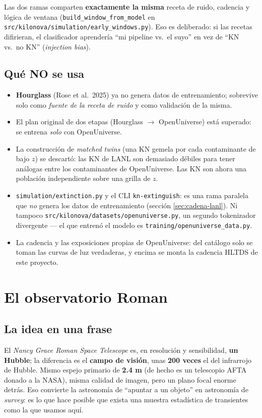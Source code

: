 \documentclass[11pt,a4paper]{article}
\newcommand{\code}[1]{\texttt{\small #1}}
\begin{document}
Las dos ramas comparten \textbf{exactamente la misma} receta de ruido, cadencia y lógica de
ventana (\code{build\_window\_from\_model} en \code{src/kilonova/simulation/early\_windows.py}).
Eso es deliberado: si las recetas difirieran, el clasificador aprendería ``mi pipeline vs.\ el
suyo'' en vez de ``KN vs.\ no KN'' (\emph{injection bias}).

\subsection{Qué NO se usa}
\begin{itemize}[nosep]
  \item \textbf{Hourglass} (Rose et al.\ 2025) ya no genera datos de entrenamiento; sobrevive solo
        como \emph{fuente de la receta de ruido} y como validación de la misma.
  \item El plan original de dos etapas (Hourglass $\to$ OpenUniverse) está superado: se entrena
        \emph{solo} con OpenUniverse.
  \item La construcción de \emph{matched twins} (una KN gemela por cada contaminante de bajo $z$)
        se descartó: las KN de LANL son demasiado débiles para tener análogas entre los
        contaminantes de OpenUniverse. Las KN son ahora una población independiente sobre una
        grilla de $z$.
  \item \code{simulation/extinction.py} y el CLI \code{kn-extinguish}: es una rama paralela que
        \emph{no} genera los datos de entrenamiento (sección \ref{sec:cadena-lanl}). Ni tampoco
        \code{src/kilonova/datasets/openuniverse.py}, un segundo tokenizador divergente ---
        el que entrenó el modelo es \code{training/openuniverse\_data.py}.
  \item La cadencia y las exposiciones propias de OpenUniverse: del catálogo solo se toman las
        curvas de luz verdaderas, y encima se monta la cadencia HLTDS de este proyecto.
\end{itemize}

\section{El observatorio Roman}

\subsection{La idea en una frase}
El \emph{Nancy Grace Roman Space Telescope} es, en resolución y sensibilidad, \textbf{un Hubble};
la diferencia es el \textbf{campo de visión}, unas \textbf{200 veces} el del infrarrojo de Hubble.
Mismo espejo primario de \textbf{2.4 m} (de hecho es un telescopio AFTA donado a la NASA), misma
calidad de imagen, pero un plano focal enorme detrás. Eso convierte la astronomía de ``apuntar a un
objeto'' en astronomía de \emph{survey}: es lo que hace posible que exista una muestra estadística
de transientes como la que usamos aquí.
\end{document}
